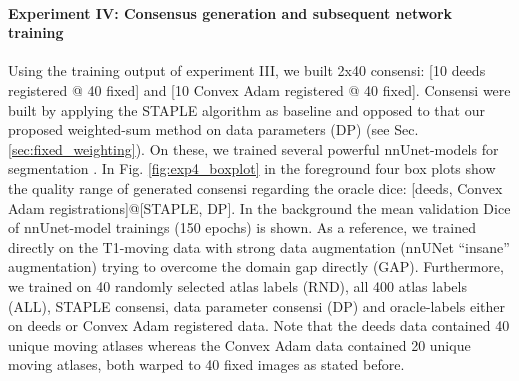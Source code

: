     \paragraph{\textbf{Experiment IV: Consensus generation and subsequent network training}}
    Using the training output of experiment III, we built 2x40 consensi: [10 deeds registered @ 40 fixed] and [10 Convex Adam registered @ 40 fixed]. Consensi were built by applying the STAPLE algorithm as baseline and opposed to that our proposed weighted-sum method on data parameters (DP) (see Sec. \ref{sec:fixed_weighting}).
    On these, we trained several powerful nnUnet-models for segmentation
    \cite{isensee2021nnu}.
    In Fig. \ref{fig:exp4_boxplot} in the foreground four box plots show the quality range of generated consensi regarding the oracle dice: [deeds, Convex Adam registrations]@[STAPLE, DP].
    In the background the mean validation Dice of nnUnet-model trainings (150 epochs) is shown. As a reference, we trained directly on the T1-moving data with strong data augmentation (nnUNet ``insane'' augmentation) trying to overcome the domain gap directly (GAP). Furthermore, we trained on 40 randomly selected atlas labels (RND), all 400 atlas labels (ALL), STAPLE consensi, data parameter consensi (DP) and oracle-labels either on deeds or Convex Adam registered data. Note that the deeds data contained 40 unique moving atlases whereas the Convex Adam data contained 20 unique moving atlases, both warped to 40 fixed images as stated before.

